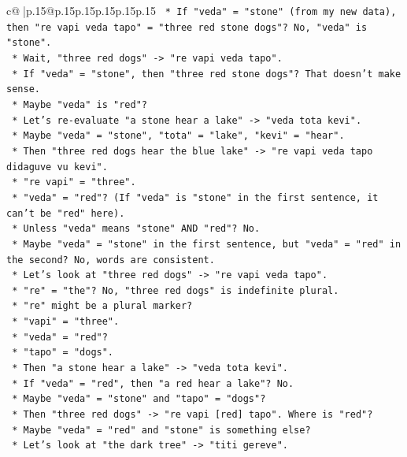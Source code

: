 \documentclass{article}
\begin{document}
{\begin{supertabular}{c@{$\;$}|p{.15\linewidth}@{}p{.15\linewidth}p{.15\linewidth}p{.15\linewidth}p{.15\linewidth}p{.15\linewidth}}
{{{\texttt{    *   If "veda" = "stone" (from my new data), then "re vapi veda tapo" = "three red stone dogs"? No, "veda" is "stone".} \\
\texttt{    *   Wait, "three red dogs" {-}> "re vapi veda tapo".} \\
\texttt{    *   If "veda" = "stone", then "three red stone dogs"? That doesn't make sense.} \\
\texttt{    *   Maybe "veda" is "red"?} \\
\texttt{    *   Let's re{-}evaluate "a stone hear a lake" {-}> "veda tota kevi".} \\
\texttt{    *   Maybe "veda" = "stone", "tota" = "lake", "kevi" = "hear".} \\
\texttt{    *   Then "three red dogs hear the blue lake" {-}> "re vapi veda tapo didaguve vu kevi".} \\
\texttt{    *   "re vapi" = "three".} \\
\texttt{    *   "veda" = "red"? (If "veda" is "stone" in the first sentence, it can't be "red" here).} \\
\texttt{    *   Unless "veda" means "stone" AND "red"? No.} \\
\texttt{    *   Maybe "veda" = "stone" in the first sentence, but "veda" = "red" in the second? No, words are consistent.} \\
\texttt{    *   Let's look at "three red dogs" {-}> "re vapi veda tapo".} \\
\texttt{    *   "re" = "the"? No, "three red dogs" is indefinite plural.} \\
\texttt{    *   "re" might be a plural marker?} \\
\texttt{    *   "vapi" = "three".} \\
\texttt{    *   "veda" = "red"?} \\
\texttt{    *   "tapo" = "dogs".} \\
\texttt{    *   Then "a stone hear a lake" {-}> "veda tota kevi".} \\
\texttt{    *   If "veda" = "red", then "a red hear a lake"? No.} \\
\texttt{    *   Maybe "veda" = "stone" and "tapo" = "dogs"?} \\
\texttt{    *   Then "three red dogs" {-}> "re vapi {[}red{]} tapo". Where is "red"?} \\
\texttt{    *   Maybe "veda" = "red" and "stone" is something else?} \\
\texttt{    *   Let's look at "the dark tree" {-}> "titi gereve".} \\
}}}
\end{supertabular}}
\end{document}
